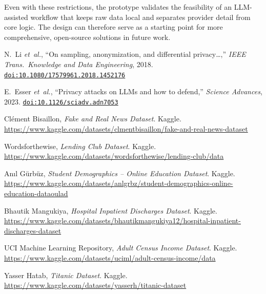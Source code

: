 \documentclass{article}
\begin{document}
Even with these restrictions, the prototype validates the feasibility of an LLM-assisted workflow that keeps raw data local and separates provider detail from core logic.  The design can therefore serve as a starting point for more comprehensive, open-source solutions in future work.


\begin{thebibliography}{9}

N.~Li \emph{et~al.},
“On sampling, anonymization, and differential privacy…,”
\emph{IEEE Trans.\ Knowledge and Data Engineering}, 2018.
\href{https://www.tandfonline.com/doi/full/10.1080/17579961.2018.1452176#abstract}{%
\texttt{doi:10.1080/17579961.2018.1452176}
}

E.~Esser \emph{et~al.},
“Privacy attacks on LLMs and how to defend,”
\emph{Science Advances}, 2023.
\href{https://www.science.org/doi/full/10.1126/sciadv.adn7053}{%
\texttt{doi:10.1126/sciadv.adn7053}
}

Clément Bisaillon,
\emph{Fake and Real News Dataset}. Kaggle.
\href{https://www.kaggle.com/datasets/clmentbisaillon/fake-and-real-news-dataset}{https://www.kaggle.com/datasets/clmentbisaillon/fake-and-real-news-dataset}

Wordsforthewise,
\emph{Lending Club Dataset}. Kaggle.
\href{https://www.kaggle.com/datasets/wordsforthewise/lending-club/data}{https://www.kaggle.com/datasets/wordsforthewise/lending-club/data}

Anıl Gürbüz,
\emph{Student Demographics – Online Education Dataset}. Kaggle.
\href{https://www.kaggle.com/datasets/anlgrbz/student-demographics-online-education-dataoulad}{https://www.kaggle.com/datasets/anlgrbz/student-demographics-online-education-dataoulad}

Bhautik Mangukiya,
\emph{Hospital Inpatient Discharges Dataset}. Kaggle.
\href{https://www.kaggle.com/datasets/bhautikmangukiya12/hospital-inpatient-discharges-dataset}{https://www.kaggle.com/datasets/bhautikmangukiya12/hospital-inpatient-discharges-dataset}

UCI Machine Learning Repository,
\emph{Adult Census Income Dataset}. Kaggle.
\href{https://www.kaggle.com/datasets/uciml/adult-census-income/data}{https://www.kaggle.com/datasets/uciml/adult-census-income/data}

Yasser Hatab,
\emph{Titanic Dataset}. Kaggle.
\href{https://www.kaggle.com/datasets/yasserh/titanic-dataset}{https://www.kaggle.com/datasets/yasserh/titanic-dataset}


\end{thebibliography}
\end{document}
